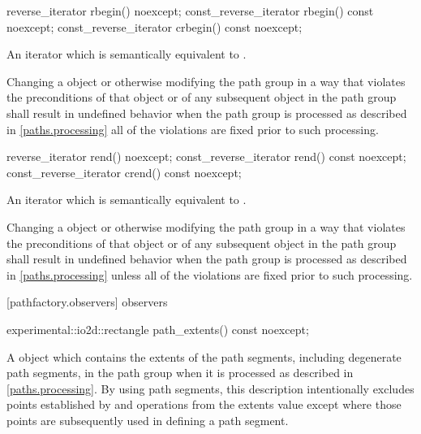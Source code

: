 \begin{itemdecl}
	reverse_iterator rbegin() noexcept;
	const_reverse_iterator rbegin() const noexcept;
	const_reverse_iterator crbegin() const noexcept;
\end{itemdecl}
\begin{itemdescr}
	\pnum
	\returns
	An iterator which is semantically equivalent to .
	
	\pnum
	\remarks
	Changing a  object or otherwise modifying the path group in a way that violates the preconditions of that  object or of any subsequent  object in the path group shall result in undefined behavior when the path group is processed as described in \ref{paths.processing} all of the violations are fixed prior to such processing.
\end{itemdescr}

\begin{itemdecl}
	reverse_iterator rend() noexcept;
	const_reverse_iterator rend() const noexcept;
	const_reverse_iterator crend() const noexcept;
\end{itemdecl}
\begin{itemdescr}
	\pnum
	\returns
	An iterator which is semantically equivalent to .
	
	\pnum
	\remarks
	Changing a  object or otherwise modifying the path group in a way that violates the preconditions of that  object or of any subsequent  object in the path group shall result in undefined behavior when the path group is processed as described in \ref{paths.processing} unless all of the violations are fixed prior to such processing.
\end{itemdescr}

 [pathfactory.observers] { observers}

\begin{itemdecl}
    experimental::io2d::rectangle path_extents() const noexcept;
\end{itemdecl}
\begin{itemdescr}
	\pnum
	\returns
	A  object which contains the extents of the path segments, including degenerate path segments, in the path group when it is processed as described in \ref{paths.processing}.
	\enternote
	By using path segments, this description intentionally excludes points established by  and  operations from the extents value except where those points are subsequently used in defining a path segment.
	\exitnote
\end{itemdescr}

